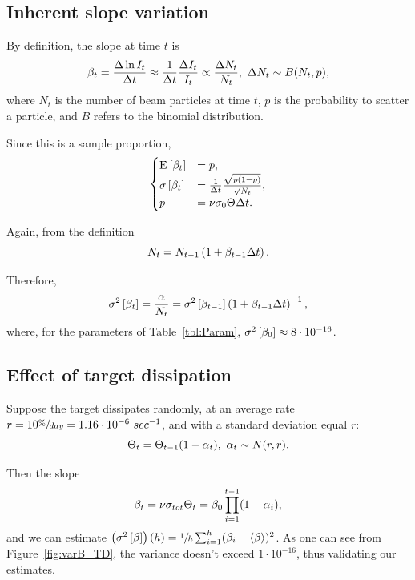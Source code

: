 \documentclass{article}
\begin{document}
\subsection{Inherent slope variation}
By definition, the slope at time $t$ is
\[
 \slp[t] = \frac{\Delta \ln I_t}{\Delta t} \approx \frac{1}{\Delta t}\frac{\Delta I_t}{I_t} \propto \frac{\Delta N_t}{N_t}, ~\Delta N_t \sim B(N_t, p),
\]
where $N_t$ is the number of beam particles at time $t$, $p$ is the probability to scatter a particle, and $B$ refers to the binomial distribution.

Since this is a sample proportion, 
\begin{equation*}
\begin{cases}
	\Xpct{\slp[t]} 	&= p, \\
	\SE{\slp[t]}		&= \frac{1}{\Delta t}\frac{\sqrt{p(1-p)}}{\sqrt{N_t}}, \\
	p 				&= \nu\CS[0]\Thick\Delta t.
\end{cases}
\end{equation*}

Again, from the definition
\[
	N_t = N_{t-1}\bkt{1 + \slp[t-1]\Delta t}.
\]

Therefore, 
\begin{equation}
\v{\slp[t]} = \frac{\alpha}{N_t} = \v{\slp[t-1]}\bkt{1 + \slp[t-1]\Delta t}^{-1},
\end{equation}
where, for the parameters of Table~\ref{tbl:Param}, $\v{\slp[0]} \approx 8\cdot10^{-16}$.

\subsection{Effect of target dissipation}
Suppose the target dissipates randomly, at an average rate $r = 10\sfrac{\%}{day} = 1.16\cdot10^{-6}~sec^{-1}$, and with a standard deviation equal $r$:
\[
	\Thick[t] = \Thick[t-1](1-\alpha_t),~ \alpha_t\sim N(r,r).
\]

Then the slope
\[
	\slp[t] = \nu\CS[tot]\Thick[t] = \slp[0]\prod_{i=1}^{t-1}(1-\alpha_i),
\]	
and we can estimate $\bkt{\v{\slp}}(h) = \sfrac 1h \sum_{i=1}^{h}(\slp[i] - \avg{\slp})^2$. As one can see from Figure~\ref{fig:varB_TD}, the variance doesn't exceed $1\cdot10^{-16}$, thus validating our estimates.
\end{document}

